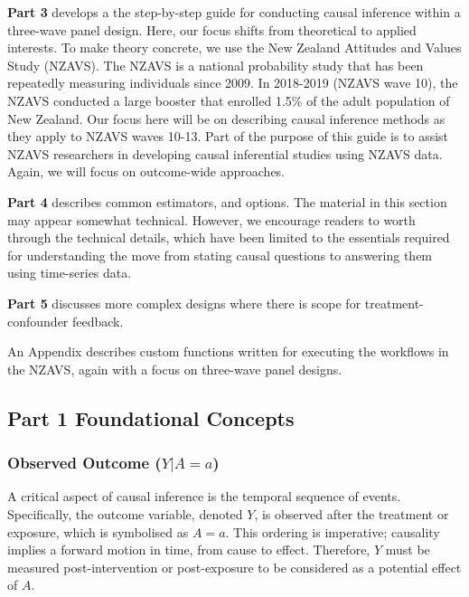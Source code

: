 \documentclass[
  singlecolumn]{article}
\begin{document}
\textbf{Part 3} develops a the step-by-step guide for conducting causal
inference within a three-wave panel design. Here, our focus shifts from
theoretical to applied interests. To make theory concrete, we use the
New Zealand Attitudes and Values Study (NZAVS). The NZAVS is a national
probability study that has been repeatedly measuring individuals since
2009. In 2018-2019 (NZAVS wave 10), the NZAVS conducted a large booster
that enrolled 1.5\% of the adult population of New Zealand. Our focus
here will be on describing causal inference methods as they apply to
NZAVS waves 10-13. Part of the purpose of this guide is to assist NZAVS
researchers in developing causal inferential studies using NZAVS data.
Again, we will focus on outcome-wide approaches.

\textbf{Part 4} describes common estimators, and options. The material
in this section may appear somewhat technical. However, we encourage
readers to worth through the technical details, which have been limited
to the essentials required for understanding the move from stating
causal questions to answering them using time-series data.

\textbf{Part 5} discusses more complex designs where there is scope for
treatment-confounder feedback.

An Appendix describes custom functions written for executing the
workflows in the NZAVS, again with a focus on three-wave panel designs.

\subsection{\texorpdfstring{\textbf{Part 1} Foundational
Concepts}{Part 1 Foundational Concepts}}\label{part-1-foundational-concepts}

\subsubsection{\texorpdfstring{Observed Outcome
(\(Y|A=a\))}{Observed Outcome (Y\textbar A=a)}}\label{observed-outcome-yaa}

A critical aspect of causal inference is the temporal sequence of
events. Specifically, the outcome variable, denoted \(Y\), is observed
after the treatment or exposure, which is symbolised as \(A=a\). This
ordering is imperative; causality implies a forward motion in time, from
cause to effect. Therefore, \(Y\) must be measured post-intervention or
post-exposure to be considered as a potential effect of \(A\).
\end{document}
